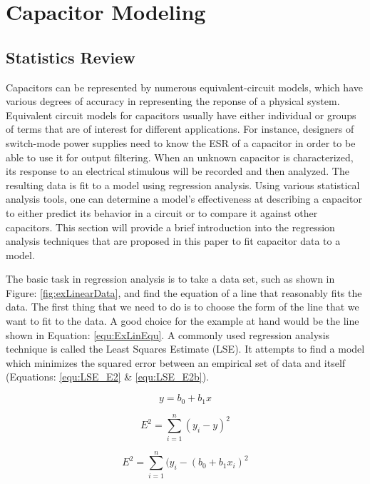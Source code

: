 \section {Capacitor Modeling}
\subsection{Statistics Review}
\label{sec:statReview}
Capacitors can be represented by numerous equivalent-circuit models, which have various degrees of accuracy in representing the reponse of a physical system. Equivalent circuit models for capacitors usually have either individual or groups of terms that are  of interest for different applications. For instance, designers of switch-mode power supplies need to know the ESR of a capacitor in order to be able to use it for output filtering. When an unknown capacitor is characterized, its response to an electrical stimulous will be recorded and then analyzed. The resulting data is fit to a model using regression analysis. Using various statistical analysis tools, one can determine a model's effectiveness at describing a capacitor to either predict its behavior in a circuit or to compare it against other capacitors. This section will provide a brief introduction into the regression analysis techniques that are proposed in this paper to fit capacitor data to a model.



The basic task in regression analysis is to take a data set, such as shown in Figure: \ref{fig:exLinearData}, and find the equation of a line that reasonably fits the data. The first thing that we need to do is to choose the form of the line that we want to fit to the data. A good choice for the example at hand would be the line shown in Equation: \eqref{equ:ExLinEqu}. A commonly used regression analysis technique is called the Least Squares Estimate (LSE). It attempts to find a model which minimizes the squared error between an empirical set of data and itself (Equations: \eqref{equ:LSE_E2} \& \eqref{equ:LSE_E2b}).

\begin{equation}
\label{equ:ExLinEqu}
y = b_0 + b_1 x
\end{equation}

\begin{equation}
\label{equ:LSE_E2}
E^2 = \sum_{i=1}^{n} (y_i - y)^2
\end{equation}

\begin{equation}
\label{equ:LSE_E2b}
E^2 = \sum_{i=1}^{n} (y_i - (b_0 + b_1 x_i)^2
\end{equation}

